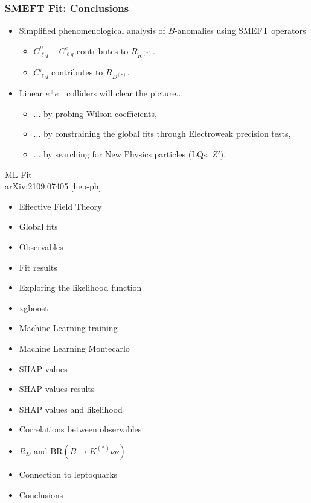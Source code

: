\documentclass[mathserif, 10pt]{beamer}
\begin{document}
\begin{frame}\frametitle{SMEFT Fit: Conclusions}

    \begin{itemize}
        \item Simplified phenomenological analysis of $B$-anomalies using SMEFT operators
              \begin{itemize}
                  \item $C_{\ell q}^\mu-C_{\ell q}^e$ contributes to  $R_{K^{(*)}}$.
                  \item $C_{\ell q}^\tau$ contributes to  $R_{D^{(*)}}$.
              \end{itemize}
        \item Linear $e^+ e^-$ colliders will clear the picture...
              \begin{itemize}
                  \item ... by probing Wilson coefficients,
                  \item ... by constraining the global fits through Electroweak precision tests,
                  \item ... by searching for New Physics particles (LQs, $Z'$).
              \end{itemize}
    \end{itemize}

\end{frame}

\begin{frame}[plain] %
    \begin{block}{{\Large ML Fit}\\arXiv:2109.07405 [hep-ph]}
        \begin{itemize}
            \item Effective Field Theory
            \item Global fits
            \item Observables
            \item Fit results
            \item Exploring the likelihood function
            \item xgboost
            \item Machine Learning training
            \item Machine Learning Montecarlo
            \item SHAP values
            \item SHAP values results
            \item SHAP values and likelihood
            \item Correlations between observables
            \item $R_D$ and $\mathrm{BR}(B\to K^{(*)}\nu\bar{\nu})$
            \item Connection to leptoquarks
            \item Conclusions
        \end{itemize}
    \end{block}
\end{frame}
\end{document}
